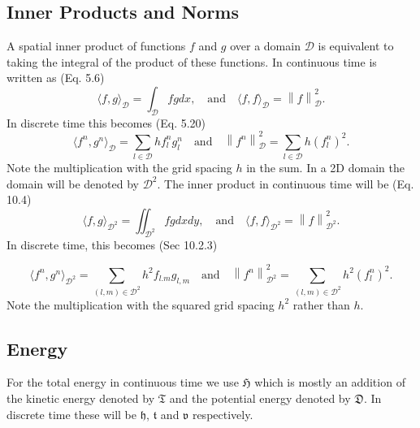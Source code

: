 \documentclass{article}
\begin{document}
\subsection{Inner Products and Norms}
A spatial inner product of functions $f$ and $g$ over a domain $\mathcal{D}$ is equivalent to taking the integral of the product of these functions. In continuous time is written as (Eq. 5.6)
\begin{equation}
    \langle f,g\rangle_\mathcal{D} = \int_\mathcal{D}fgdx, 
\quad \text{and} \quad 
    \langle f,f \rangle_\mathcal{D} = \left\lVert f \right\rVert^2_\mathcal{D}.
\end{equation}
In discrete time this becomes (Eq. 5.20)
\begin{equation}\label{eq:innerProduct}
     \langle f^n,g^n\rangle_\mathcal{D} = \sum_{l\in\mathcal{D}}h f^n_l g^n_l \quad \text{and} \quad \left\lVert f^n \right\rVert^2_\mathcal{D} = \sum_{l\in\mathcal{D}}h(f^n_l)^2.
\end{equation}
Note the multiplication with the grid spacing $h$ in the sum. In a 2D domain the domain will be denoted by $\mathcal{D}^2$. The inner product in continuous time will be (Eq. 10.4)
\begin{equation}
    \langle f,g\rangle_{\mathcal{D}^2} = \iint_{\mathcal{D}^2}fgdxdy, 
\quad \text{and} \quad 
    \langle f,f \rangle_{\mathcal{D}^2} = \left\lVert f \right\rVert^2_{\mathcal{D}^2}.
\end{equation}
In discrete time, this becomes (Sec 10.2.3)

\begin{equation}\label{eq:discrete2DInnerProduct}
    \langle f^n, g^n \rangle_{\mathcal{D}^2} = \sum_{(l,m)\in\mathcal{D}^2}h^2f_{l.m}g_{l,m} \quad \text{and} \quad \left\lVert f^n \right\rVert_{\mathcal{D}^2}^2 = \sum_{(l,m)\in\mathcal{D}^2}h^2(f_l^n)^2.
\end{equation}
Note the multiplication with the squared grid spacing $h^2$ rather than $h$.
\subsection{Energy}
For the total energy in continuous time we use $\mathfrak{H}$ which is mostly an addition of the kinetic energy denoted by $\mathfrak{T}$ and the potential energy denoted by $\mathfrak{D}$. In discrete time these will be $\mathfrak{h}$, $\mathfrak{t}$ and $\mathfrak{v}$ %
respectively.
\end{document}
